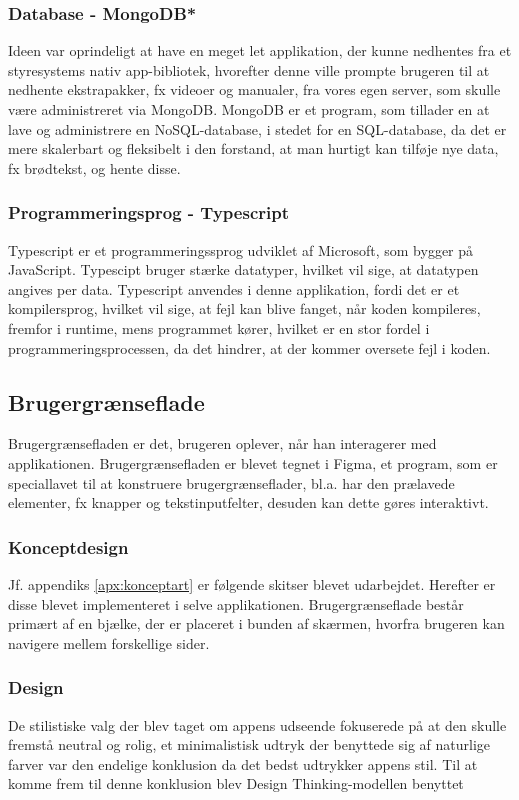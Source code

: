 \subsubsection{Database - MongoDB*}
Ideen var oprindeligt at have en meget let applikation, der kunne nedhentes fra et styresystems nativ app-bibliotek, hvorefter denne ville prompte brugeren til at nedhente ekstrapakker, fx videoer og manualer, fra vores egen server, som skulle være administreret via MongoDB. MongoDB er et program, som tillader en at lave og administrere en NoSQL-database, i stedet for en SQL-database, da det er mere skalerbart og fleksibelt i den forstand, at man hurtigt kan tilføje nye data, fx brødtekst, og hente disse. 
\subsubsection{Programmeringsprog - Typescript}
Typescript er et programmeringssprog udviklet af Microsoft, som bygger på JavaScript. Typescipt bruger stærke datatyper, hvilket vil sige, at datatypen angives per data. Typescript anvendes i denne applikation, fordi det er et kompilersprog, hvilket vil sige, at fejl kan blive fanget, når koden kompileres, fremfor i runtime, mens programmet kører, hvilket er en stor fordel i programmeringsprocessen, da det hindrer, at der kommer oversete fejl i koden.
\subsection{Brugergrænseflade}
Brugergrænsefladen er det, brugeren oplever, når han interagerer med applikationen. Brugergrænsefladen er blevet tegnet i Figma, et program, som er speciallavet til at konstruere brugergrænseflader, bl.a. har den prælavede elementer, fx knapper og tekstinputfelter, desuden kan dette gøres interaktivt. 
\subsubsection{Konceptdesign}
Jf. appendiks \ref{apx:konceptart} er følgende skitser blevet udarbejdet. Herefter er disse blevet implementeret i selve applikationen. Brugergrænseflade består primært af en bjælke, der er placeret i bunden af skærmen, hvorfra brugeren kan navigere mellem forskellige sider.
\subsubsection{Design}
De stilistiske valg der blev taget om appens udseende fokuserede på at den skulle fremstå neutral og rolig, et minimalistisk udtryk der benyttede sig af naturlige farver var den endelige konklusion da det bedst udtrykker appens stil. Til at komme frem til denne konklusion blev Design Thinking-modellen benyttet \cite{Design-grundbog}

